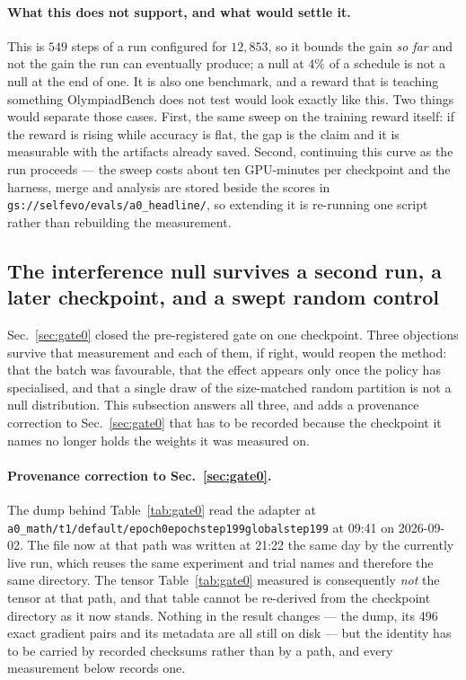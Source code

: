 \paragraph{What this does not support, and what would settle it.} This is $549$ steps of a
run configured for $12{,}853$, so it bounds the gain \emph{so far} and not the gain the run
can eventually produce; a null at $4\%$ of a schedule is not a null at the end of one. It is
also one benchmark, and a reward that is teaching something OlympiadBench does not test would
look exactly like this. Two things would separate those cases. First, the same sweep on the
training reward itself: if the reward is rising while accuracy is flat, the gap is the claim
and it is measurable with the artifacts already saved. Second, continuing this curve as the
run proceeds --- the sweep costs about ten GPU-minutes per checkpoint and the harness,
merge and analysis are stored beside the scores in
\texttt{gs://selfevo/evals/a0\_headline/}, so extending it is re-running one script rather
than rebuilding the measurement.

\subsection{The interference null survives a second run, a later checkpoint, and a swept
random control}
\label{sec:gate0late}

Sec.~\ref{sec:gate0} closed the pre-registered gate on one checkpoint. Three objections
survive that measurement and each of them, if right, would reopen the method: that the batch
was favourable, that the effect appears only once the policy has specialised, and that a
single draw of the size-matched random partition is not a null distribution. This subsection
answers all three, and adds a provenance correction to Sec.~\ref{sec:gate0} that has to be
recorded because the checkpoint it names no longer holds the weights it was measured on.

\paragraph{Provenance correction to Sec.~\ref{sec:gate0}.} The dump behind Table~\ref{tab:gate0}
read the adapter at \texttt{a0\_math/t1/default/\allowbreak epoch0epochstep199globalstep199} at
09:41 on 2026-09-02. The file now at that path was written at 21:22 the same day by the
currently live run, which reuses the same experiment and trial names and therefore the same
directory. The tensor Table~\ref{tab:gate0} measured is consequently \emph{not} the tensor at
that path, and that table cannot be re-derived from the checkpoint directory as it now stands.
Nothing in the result changes --- the dump, its 496 exact gradient pairs and its metadata are
all still on disk --- but the identity has to be carried by recorded checksums rather than by a
path, and every measurement below records one.

